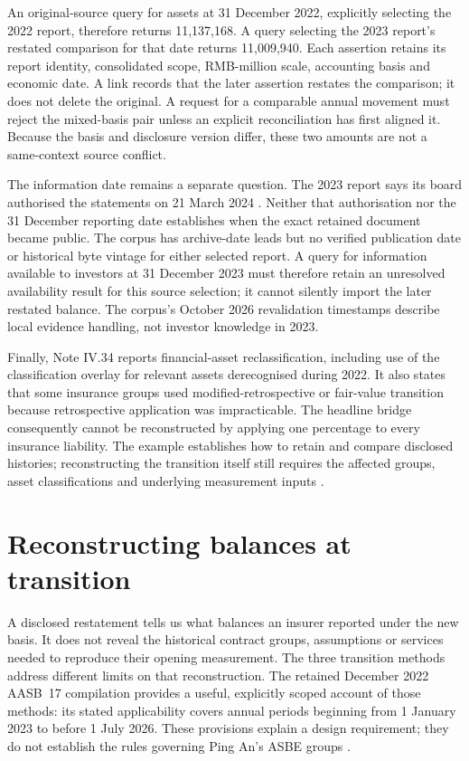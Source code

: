 An original-source query for assets at 31 December 2022, explicitly selecting
the 2022 report, therefore returns 11,137,168. A query selecting the 2023
report's restated comparison for that date returns 11,009,940. Each assertion
retains its report identity, consolidated scope, RMB-million scale, accounting
basis and economic date. A link records that the later assertion restates the
comparison; it does not delete the original. A request for a comparable annual
movement must reject the mixed-basis pair unless an explicit reconciliation
has first aligned it. Because the basis and disclosure version differ, these
two amounts are not a same-context source conflict.

The information date remains a separate question. The 2023 report says its
board authorised the statements on 21 March 2024
\citep[Note I, p.~154]{pingan2023asbe}. Neither that authorisation nor the
31 December reporting date establishes when the exact retained document became
public. The corpus has archive-date leads but no verified publication date or
historical byte vintage for either selected report. A query for information
available to investors at 31 December 2023 must therefore retain an unresolved
availability result for this source selection; it cannot silently import the
later restated balance. The corpus's October 2026 revalidation timestamps
describe local evidence handling, not investor knowledge in 2023.

Finally, Note IV.34 reports financial-asset reclassification, including use of
the classification overlay for relevant assets derecognised during 2022. It
also states that some insurance groups used modified-retrospective or
fair-value transition because retrospective application was impracticable.
The headline bridge consequently cannot be reconstructed by applying one
percentage to every insurance liability. The example establishes how to retain
and compare disclosed histories; reconstructing the transition itself still
requires the affected groups, asset classifications and underlying measurement
inputs \citep[Note IV.34, p.~192]{pingan2023asbe}.

\clearpage
\section{Reconstructing balances at transition}
\label{sec:insurance-transition}

A disclosed restatement tells us what balances an insurer reported under the
new basis. It does not reveal the historical contract groups, assumptions or
services needed to reproduce their opening measurement. The three transition
methods address different limits on that reconstruction. The retained
December 2022 AASB~17 compilation provides a useful, explicitly scoped account
of those methods: its stated applicability covers annual periods beginning
from 1 January 2023 to before 1 July 2026. These provisions explain a design
requirement; they do not establish the rules governing Ping An's ASBE groups
\citep[Appendix C]{aasb17}.

